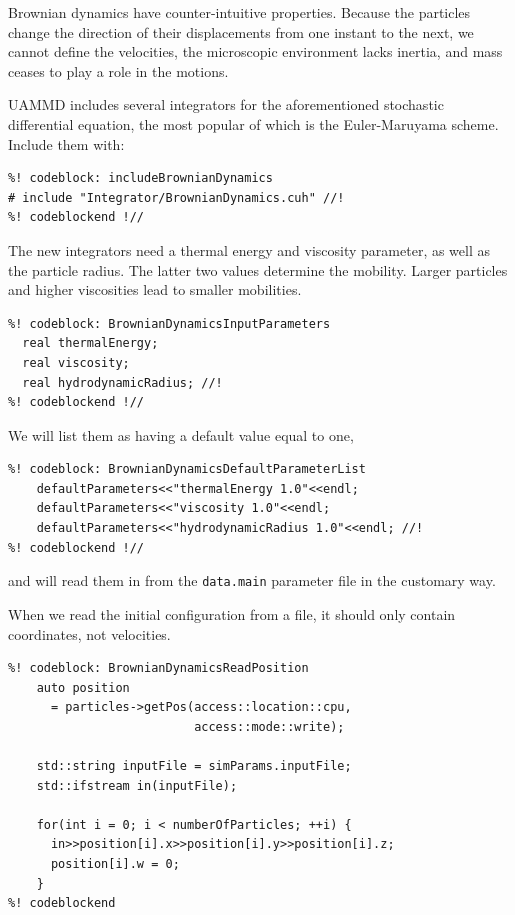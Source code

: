 Brownian dynamics have counter-intuitive properties. Because the particles 
change the direction of their displacements from one instant to the next, we 
cannot define the velocities, the microscopic environment lacks inertia, and 
mass ceases to play a role in the motions.

UAMMD includes several integrators for the aforementioned stochastic 
differential equation, the most popular of which is the Euler-Maruyama scheme.
Include them with:
\begin{lstlisting}
%! codeblock: includeBrownianDynamics
# include "Integrator/BrownianDynamics.cuh" //!
%! codeblockend !//
\end{lstlisting}

The new integrators need a thermal energy and viscosity parameter, as well as 
the particle radius. The latter two values determine the mobility. Larger 
particles and higher viscosities lead to smaller mobilities.
\begin{lstlisting}
%! codeblock: BrownianDynamicsInputParameters
  real thermalEnergy;
  real viscosity;
  real hydrodynamicRadius; //!
%! codeblockend !//
\end{lstlisting}
We will list them as having a default value equal to one,
\begin{lstlisting}
%! codeblock: BrownianDynamicsDefaultParameterList
    defaultParameters<<"thermalEnergy 1.0"<<endl;
    defaultParameters<<"viscosity 1.0"<<endl;
    defaultParameters<<"hydrodynamicRadius 1.0"<<endl; //!
%! codeblockend !//
\end{lstlisting}
and will read them in from the \texttt{data.main} parameter file in the 
customary way.

When we read the initial configuration from a file, it should only contain 
coordinates, not velocities.
\begin{lstlisting}
%! codeblock: BrownianDynamicsReadPosition
    auto position
      = particles->getPos(access::location::cpu,
                          access::mode::write);

    std::string inputFile = simParams.inputFile;
    std::ifstream in(inputFile);

    for(int i = 0; i < numberOfParticles; ++i) {
      in>>position[i].x>>position[i].y>>position[i].z;
      position[i].w = 0;
    }
%! codeblockend
\end{lstlisting}

